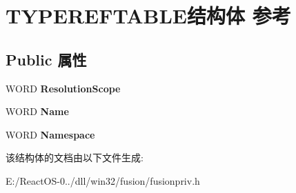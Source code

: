 \hypertarget{struct_t_y_p_e_r_e_f_t_a_b_l_e}{}\section{T\+Y\+P\+E\+R\+E\+F\+T\+A\+B\+L\+E结构体 参考}
\label{struct_t_y_p_e_r_e_f_t_a_b_l_e}
\subsection*{Public 属性}
\begin{DoxyCompactItemize}
\item 
\mbox{\label{struct_t_y_p_e_r_e_f_t_a_b_l_e_a05381c6298aaff0730092934c2cdc148}} 
W\+O\+RD {\bfseries Resolution\+Scope}
\item 
\mbox{\label{struct_t_y_p_e_r_e_f_t_a_b_l_e_a13afc4bcd14c00b56c6419db2294627f}} 
W\+O\+RD {\bfseries Name}
\item 
\mbox{\label{struct_t_y_p_e_r_e_f_t_a_b_l_e_ab2dc67bcc344edf204fcf74a0da0e655}} 
W\+O\+RD {\bfseries Namespace}
\end{DoxyCompactItemize}


该结构体的文档由以下文件生成\+:\begin{DoxyCompactItemize}
\item 
E\+:/\+React\+O\+S-\/0../dll/win32/fusion/fusionpriv.\+h\end{DoxyCompactItemize}
